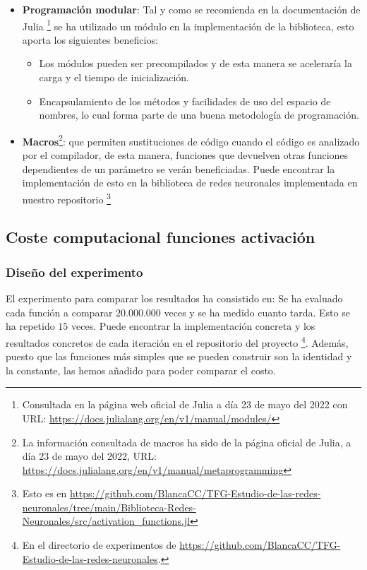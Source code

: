 \begin{itemize}
    \item \textbf{Programación modular}: Tal y como se recomienda en la documentación de Julia \footnote{
        Consultada en la página web oficial de Julia  a día 23 de mayo del 2022 con URL: \url{https://docs.julialang.org/en/v1/manual/modules/}
    } se ha utilizado un módulo en la implementación de la biblioteca, esto aporta los siguientes beneficios: 
    \begin{itemize}
        \item Los módulos pueden ser precompilados y de esta manera se aceleraría la carga y el tiempo de inicialización. 
        \item Encapsulamiento de los métodos y facilidades de uso del espacio de nombres, lo cual forma parte
        de una buena metodología de programación. 
    \end{itemize}
    \item \textbf{Macros}\footnote{La información consultada de macros ha sido  de la página oficial de Julia, a día 23 de mayo del 2022, URL:
    \url{https://docs.julialang.org/en/v1/manual/metaprogramming}}:
    que permiten sustituciones de código cuando el código es analizado por el compilador, 
    de esta manera, funciones que devuelven otras funciones dependientes de un parámetro se verán beneficiadas. 
     Puede encontrar la implementación de esto en la biblioteca de redes neuronales implementada en nuestro 
     repositorio \footnote{Esto es en \url{https://github.com/BlancaCC/TFG-Estudio-de-las-redes-neuronales/tree/main/Biblioteca-Redes-Neuronales/src/activation_functions.jl}}
\end{itemize}




\subsection{Coste computacional funciones activación }
\label{ch06:coste-computacional-funciones-activacion}

\subsubsection{Diseño del experimento}
El experimento para comparar los resultados ha consistido en: 
Se ha evaluado cada función a comparar $20.000.000$ veces y se ha medido cuanto tarda. 
Esto se ha repetido $15$ veces. Puede encontrar la implementación concreta y los resultados concretos de cada iteración en el repositorio del
proyecto \footnote{En el directorio de experimentos 
de \url{https://github.com/BlancaCC/TFG-Estudio-de-las-redes-neuronales}.}.
Además, puesto que las funciones más simples que se pueden construir son la identidad y la constante, las hemos añadido para poder comparar el costo. 

